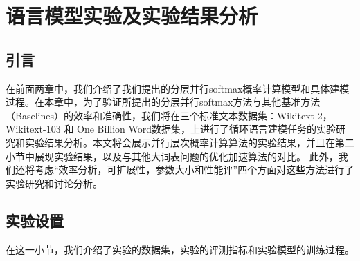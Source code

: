 
\chapter{语言模型实验及实验结果分析}
\section{引言}
在前面两章中，我们介绍了我们提出的分层并行softmax概率计算模型和具体建模过程。在本章中，为了验证所提出的分层并行softmax方法与其他基准方法（Baselines）的效率和准确性，我们将在三个标准文本数据集：Wikitext-2，Wikitext-103 和 One Billion Word数据集，上进行了循环语言建模任务的实验研究和实验结果分析。本文将会展示并行层次概率计算算法的实验结果，并且在第二小节中展现实验结果，以及与其他大词表问题的优化加速算法的对比。 此外，我们还将考虑``效率分析，可扩展性，参数大小和性能评''四个方面对这些方法进行了实验研究和讨论分析。

\section{实验设置}
在这一小节，我们介绍了实验的数据集，实验的评测指标和实验模型的训练过程。
